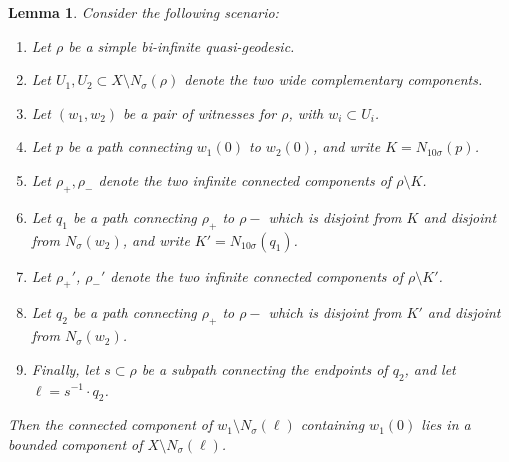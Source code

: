 \documentclass[11pt,a4paper]{amsart}
\DeclareMathOperator{\dist}{d}
\newtheorem{lemma}[theorem]{Lemma}
\theoremstyle{definition}
\begin{document}
\begin{lemma}\label{lem:lies-in-bounded-component}
    Consider the following scenario:
    \begin{enumerate}
        \item Let $\rho$ be a simple bi-infinite quasi-geodesic.

        \item Let $U_1, U_2 \subset X\setminus N_\sigma(\rho)$ denote the two wide complementary components.

        \item Let $(w_1, w_2)$ be a pair of witnesses for $\rho$, with $ w_i \subset U_i$. 

        \item Let $p$ be a path connecting $w_1(0)$ to $w_2(0)$, and write $K = N_{10\sigma}(p)$.

        \item Let $\rho_+, \rho_-$ denote the two infinite connected components of $\rho \setminus K$.

        \item Let $q_1$ be a path connecting $\rho_+$ to $\rho-$ which is disjoint from $K$ and disjoint from $N_\sigma(w_2)$, and write $K' = N_{10\sigma}(q_1)$. 

        \item Let $\rho_+'$, $\rho_-'$ denote the two infinite connected components of $\rho \setminus K'$.

        \item Let $q_2$ be a path connecting $\rho_+$ to $\rho-$ which is disjoint from $K'$ and disjoint from $N_\sigma(w_2)$.

        \item Finally, let $s \subset \rho$ be a subpath connecting the endpoints of $q_2$, and let $\ell =  s^{-1} 
        \cdot q_2$. 
    \end{enumerate}
    Then the connected component of $w_1\setminus N_\sigma(\ell)$ containing $w_1(0)$ lies in a bounded component of $X \setminus N_\sigma(\ell)$.
\end{lemma}
\end{document}
